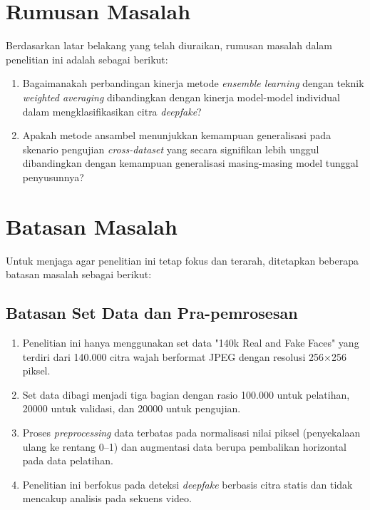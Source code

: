 \section{Rumusan Masalah}

Berdasarkan latar belakang yang telah diuraikan, rumusan masalah dalam penelitian ini adalah sebagai berikut:

\begin{enumerate}
\item Bagaimanakah perbandingan kinerja metode \textit{ensemble learning} dengan teknik \textit{weighted averaging} dibandingkan dengan kinerja model-model individual dalam mengklasifikasikan citra \textit{deepfake}?

\item Apakah metode ansambel menunjukkan kemampuan generalisasi pada skenario pengujian \textit{cross-dataset} yang secara signifikan lebih unggul dibandingkan dengan kemampuan generalisasi masing-masing model tunggal penyusunnya?
\end{enumerate}

\section{Batasan Masalah}

Untuk menjaga agar penelitian ini tetap fokus dan terarah, ditetapkan beberapa batasan masalah sebagai berikut:

\subsection{Batasan Set Data dan Pra-pemrosesan}
\begin{enumerate}
\item Penelitian ini hanya menggunakan set data "140k Real and Fake Faces" yang terdiri dari 140.000 citra wajah berformat JPEG dengan resolusi 256×256 piksel.

\item Set data dibagi menjadi tiga bagian dengan rasio 100.000 untuk pelatihan, 20000 untuk validasi, dan 20000 untuk pengujian.

\item Proses \textit{preprocessing} data terbatas pada normalisasi nilai piksel (penyekalaan ulang ke rentang 0–1) dan augmentasi data berupa pembalikan horizontal pada data pelatihan.

\item Penelitian ini berfokus pada deteksi \textit{deepfake} berbasis citra statis dan tidak mencakup analisis pada sekuens video.
\end{enumerate}


